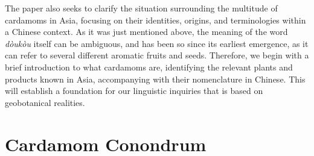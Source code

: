 \documentclass[12pt]{article}
\newcommand{\tc}[1]{\traditionalchinesefont{#1}\rmfamily}
\begin{document}




The paper also seeks to clarify the situation surrounding the multitude of cardamoms in Asia, focusing on their identities, origins, and terminologies within a Chinese context. As it was just mentioned above, the meaning of the word \textit{dòukòu} itself can be ambiguous, and has been so since its earliest emergence, as it can refer to several different aromatic fruits and seeds. Therefore, we begin with a brief introduction to what cardamoms are, identifying the relevant plants and products known in Asia, accompanying with their nomenclature in Chinese. This will establish a foundation for our linguistic inquiries that is based on geobotanical realities.

\section{Cardamom Conondrum}\label{sec:one}
\end{document}

